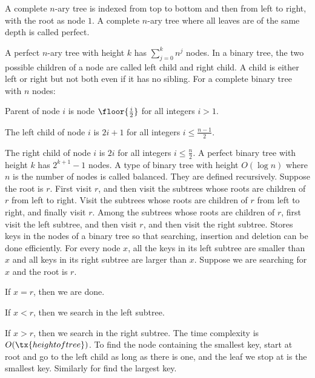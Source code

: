 \documentclass[a4paper,12pt]{article}
\begin{document}
A complete $n$-ary tree is indexed from top to bottom and then from left to right, with the root as node $1$.
A complete $n$-ary tree where all leaves are of the same depth is called perfect.

A perfect $n$-ary tree with height $k$ has $\sum_{j=0}^kn^j$ nodes.
In a binary tree, the two possible children of a node are called left child and right child. A child is either left or right but not both even if it has no sibling.
For a complete binary tree with $n$ nodes:
\bit
\item Parent of node $i$ is node $\floor{\frac{i}{2}}$ for all integers $i>1$.
\item The left child of node $i$ is $2i+1$ for all integers $i\le\frac{n-1}{2}$.
\item The right child of node $i$ is $2i$ for all integers $i\le\frac{n}{2}$.
\eit
{}
A perfect binary tree with height $k$ has $2^{k+1}-1$ nodes.
A type of binary tree with height $O(\log n)$ where $n$ is the number of nodes is called balanced.
They are defined recursively. Suppose the root is $r$.
First visit $r$, and then visit the subtrees whose roots are children of $r$ from left to right.
Visit the subtrees whose roots are children of $r$ from left to right, and finally visit $r$.
Among the subtrees whose roots are children of $r$, first visit the left subtree, and then visit $r$, and then visit the right subtree.
Stores keys in the nodes of a binary tree so that searching, insertion and deletion can be done efficiently. For every node $x$, all the keys in its left subtree are smaller than $x$ and all keys in its right subtree are larger than $x$.
Suppose we are searching for $x$ and the root is $r$.
\bit
\item If $x=r$, then we are done.
\item If $x<r$, then we search in the left subtree.
\item If $x>r$, then we search in the right subtree.
\eit
The time complexity is $O(\tx{height of tree})$.
To find the node containing the smallest key, start at root and go to the left child as long as there is one, and the leaf we stop at is the smallest key. Similarly for find the largest key.
\end{document}
